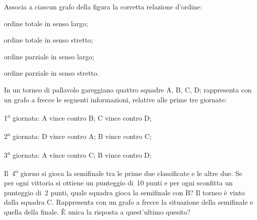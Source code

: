 \begin{esercizio}
\label{ese:7.56}
Associa a ciascun grafo della figura %
la corretta relazione d'ordine:
\begin{enumeratea}
\item ordine totale in senso largo;
\item ordine totale in senso stretto;
\item ordine parziale in senso largo;
\item ordine parziale in senso stretto.
\end{enumeratea}
\begin{center}
 
\end{center}
\end{esercizio}
\pagebreak
\begin{esercizio}
\label{ese:7.57}
In un torneo di pallavolo gareggiano quattro squadre A, B, C, D; rappresenta con un grafo a frecce le seguenti informazioni, relative alle prime tre giornate:
\begin{itemize*}
\item 1\textsuperscript{a} giornata: A vince contro B; C vince contro D;
\item 2\textsuperscript{a} giornata: D vince contro A; B vince contro C;
\item 3\textsuperscript{a} giornata: A vince contro C; B vince contro D;
\end{itemize*}
Il~4\textsuperscript{o} giorno si gioca la semifinale tra le prime due classificate e le altre due. Se per ogni vittoria si ottiene un punteggio di~10 punti e per ogni sconfitta un punteggio
di~2 punti, quale squadra gioca la semifinale con B?
Il torneo è vinto dalla squadra C. Rappresenta con un grafo a frecce la situazione della semifinale e quella
della finale. \`E unica la risposta a quest'ultimo quesito?
\end{esercizio}

